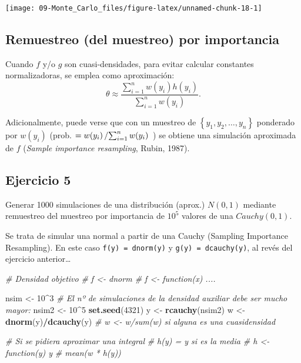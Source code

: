 \documentclass[
]{book}
\newenvironment{Shaded}{\begin{snugshade}}{\end{snugshade}}
\newcommand{\CommentTok}[1]{\textcolor[rgb]{0.56,0.35,0.01}{\textit{#1}}}
\newcommand{\DecValTok}[1]{\textcolor[rgb]{0.00,0.00,0.81}{#1}}
\newcommand{\KeywordTok}[1]{\textcolor[rgb]{0.13,0.29,0.53}{\textbf{#1}}}
\newcommand{\NormalTok}[1]{#1}
\newcommand{\OperatorTok}[1]{\textcolor[rgb]{0.81,0.36,0.00}{\textbf{#1}}}
\newcommand{\StringTok}[1]{\textcolor[rgb]{0.31,0.60,0.02}{#1}}
\theoremstyle{break}
\theoremstyle{definition}
\theoremstyle{definition}
\theoremstyle{definition}
\theoremstyle{remark}
\begin{document}
\begin{center}\texttt{[image: 09-Monte\_Carlo\_files/figure-latex/unnamed-chunk-18-1]} \end{center}

\hypertarget{remuestreo-del-muestreo-por-importancia}{%
\subsection{Remuestreo (del muestreo) por importancia}\label{remuestreo-del-muestreo-por-importancia}}

Cuando \(f\) y/o \(g\) son cuasi-densidades, para evitar calcular constantes
normalizadoras, se emplea como
aproximación:
\[\theta \approx \frac{\sum\limits_{i=1}^{n}w(y_{i})h\left( y_{i}\right) }{ \sum\limits_{i=1}^{n}w(y_{i})}.\]

Adicionalmente, puede verse que con un muestreo de
\(\left\{y_{1},y_{2},\ldots ,y_{n}\right\}\)
ponderado por \(w(y_{i})\)
(prob. \(=w(y_{i})\left/ \sum\nolimits_{i=1}^{n}w(y_{i}) \right.\) )
se obtiene una simulación aproximada de \(f\)
(\emph{Sample importance resampling}, Rubin, 1987).

\hypertarget{ejercicio-5}{%
\subsection{Ejercicio 5}\label{ejercicio-5}}

Generar 1000 simulaciones de una distribución (aprox.) \(N(0,1)\)
mediante remuestreo del muestreo por importancia de \(10^{5}\) valores
de una \(Cauchy(0,1)\).

Se trata de simular una normal a partir de una Cauchy (Sampling Importance Resampling).
En este caso \texttt{f(y)\ =\ dnorm(y)} y \texttt{g(y)\ =\ dcauchy(y)}, al revés del ejercicio anterior\ldots{}

\begin{Shaded}
\begin{Highlighting}[]
\CommentTok{# Densidad objetivo}
\CommentTok{# f <- dnorm # f <- function(x) ....}

\NormalTok{nsim <-}\StringTok{ }\DecValTok{10}\OperatorTok{^}\DecValTok{3}
\CommentTok{# El nº de simulaciones de la densidad auxiliar debe ser mucho mayor:}
\NormalTok{nsim2 <-}\StringTok{ }\DecValTok{10}\OperatorTok{^}\DecValTok{5}
\KeywordTok{set.seed}\NormalTok{(}\DecValTok{4321}\NormalTok{)}
\NormalTok{y <-}\StringTok{ }\KeywordTok{rcauchy}\NormalTok{(nsim2)}
\NormalTok{w <-}\StringTok{ }\KeywordTok{dnorm}\NormalTok{(y)}\OperatorTok{/}\KeywordTok{dcauchy}\NormalTok{(y) }\CommentTok{# w <- w/sum(w) si alguna es una cuasidensidad}

\CommentTok{# Si se pidiera aproximar una integral}
\CommentTok{# h(y) = y si es la media # h <- function(y) y}
\CommentTok{# mean(w * h(y))}
\end{Highlighting}
\end{Shaded}
\end{document}
